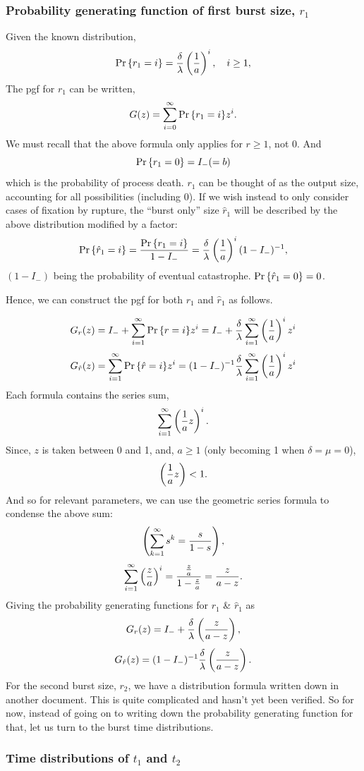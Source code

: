 \subsubsection*{Probability generating function of first burst size, $r_1$}
 Given the known distribution, 
 $${\text{Pr}\left\{r_1=i\right\}} = \frac{\delta}{\lambda}\left(\frac{1}{a}\right)^i, \quad i\geq1,$$
 The pgf for $r_1$ can be written, 
 $$G(z) = \sum^{\infty}_{i=0} {\text{Pr}\left\{r_1=i\right\}}  z^i.$$
We must recall that the above formula only applies for $r\geq1$, not 0. And 
$${\text{Pr}\left\{r_1 = 0\right\}} = I_- (=b) $$
which is the probability of process death. $r_1$ can be thought of as the output size, accounting for all possibilities (including 0). If we wish instead to only consider cases of fixation by rupture, the ``burst only'' size $\hat r_1$ will be described by the above distribution modified by a factor:
$${\text{Pr}\left\{\hat r_1 = i\right\}} = \frac{{\text{Pr}\left\{r_1 = i\right\}}}{1- I_-} = \frac{\delta}{\lambda}\left(\frac{1}{a}\right)^i (1-I_-)^{-1},$$
$(1-I_-)$ being the probability of eventual catastrophe. ${\text{Pr}\left\{\hat r_1 = 0\right\}} = 0$.\par
Hence, we can construct the pgf for both $r_1$ and $\hat r_1$ as follows. 

$$G_r(z) = I_- + \sum^{\infty}_{i=1} {\text{Pr}\left\{r=i\right\}} z^i = I_- + \frac{\delta}{\lambda}  \sum^{\infty}_{i=1} \left(\frac{1}{a}\right)^i z^i$$
$$G_{\hat r}(z) = \sum^{\infty}_{i=1} {\text{Pr}\left\{\hat r=i\right\}} z^i = (1 - I_-)^{-1} \frac{\delta}{\lambda}  \sum^{\infty}_{i=1} \left(\frac{1}{a}\right)^i z^i$$
Each formula contains the series sum,
$$\sum^{\infty}_{i=1} \left(\frac{1}{a} z\right)^i.$$
Since, $z$ is taken between 0 and 1, and, $a \geq 1$ (only becoming 1 when $\delta = \mu = 0$), 
$$\left(\frac{1}{a} z\right) < 1.$$
And so for relevant parameters, we can use the geometric series formula to condense the above sum:
$$\left(\sum_{k=1}^\infty s^k  = \frac{s}{1-s}\right),$$ 
$$\sum^\infty_{i=1}\left(\frac{z}{a}\right)^i = \frac{\frac{z}{a}}{1 - \frac{z}{a}} = \frac{z}{a-z}.$$
Giving the probability generating functions for $r_1$ \& $\hat r_1$ as 
$$G_r(z) =  I_- + \frac{\delta}{\lambda} \left(\frac{z}{a-z}\right),$$
$$G_{\hat r}(z) = (1 - I_-)^{-1} \frac{\delta}{\lambda} \left(\frac{z}{a-z}\right).$$
For the second burst size, $r_2$, we have a distribution formula written down in another document. This is quite complicated and hasn't yet been verified. So for now, instead of going on to writing down the probability generating function for that, let us turn to the burst time distributions. 

\subsubsection*{Time distributions of $t_1$ and $t_2$} 

